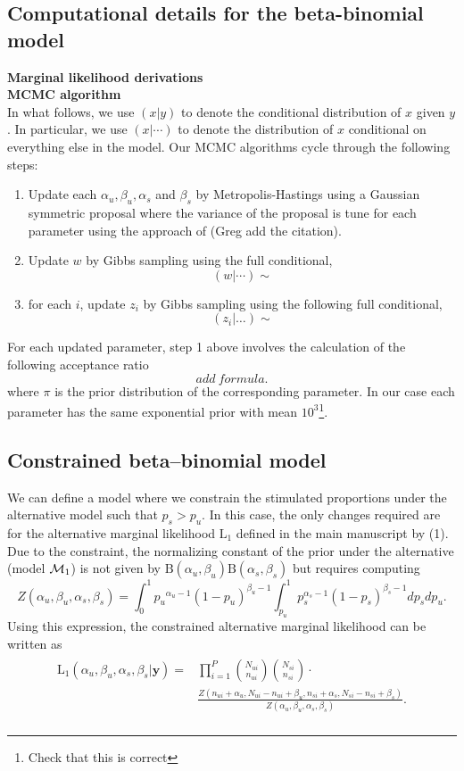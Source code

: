 \documentclass{article}
\begin{document}
\subsection{Computational details for the beta-binomial model}
\noindent\textbf{Marginal likelihood derivations}\\
\noindent\textbf{MCMC algorithm}\\
In what follows, we use $(x|y)$ to denote the conditional distribution of $x$ given $y$. In particular, we use $(x|\cdots)$ to denote the distribution of $x$ conditional on everything else in the model. Our MCMC algorithms cycle through the following steps: 
\begin{enumerate}
\item Update each $\alpha_u, \beta_u, \alpha_s$ and $\beta_s$ by Metropolis-Hastings using a Gaussian symmetric proposal where the variance of the proposal is tune for each parameter using the approach of (Greg add the citation).
\item Update $w$ by Gibbs sampling using the full conditional,
\[
(w|\cdots)\sim
\]
\item for each $i$, update $z_i$ by Gibbs sampling using the following full conditional,
\[
(z_i|\dots)\sim
\]
\end{enumerate}
For each updated parameter, step 1 above involves the calculation of the following acceptance ratio
\[
add\ formula.
\]
where $\pi$ is the prior distribution of the corresponding parameter. In our case each parameter has the same exponential prior with mean $10^3$\footnote{Check that this is correct}.
\subsection{Constrained beta--binomial model}
\label{supp:constrained}
We can define a model where we constrain the stimulated proportions under the alternative model such that $p_s>p_u$. In this case, the only changes required are for the alternative marginal likelihood $\mathrm{L}_1$ defined in the main manuscript by (1). Due to the constraint, the normalizing constant of the prior under the alternative (model ${\cal M}_1$) is not given by $\mathrm{B}(\alpha_u,\beta_u)\mathrm{B}(\alpha_s,\beta_s)$ but requires computing \[
Z(\alpha_u, \beta_u, \alpha_s, \beta_s)=\int_{0}^1{p_u}^{\alpha_u-1}(1-p_u)^{\beta_u-1}\int_{p_u}^1 p_s^{\alpha_s-1}(1-p_s)^{\beta_s-1}dp_sdp_u.
\]
Using this expression, the constrained alternative marginal likelihood can be written as 
\begin{align}
	\begin{split}
\mathrm{L}_1(\alpha_u,\beta_u,\alpha_s,\beta_s|\mathbf{y}) 
=&\prod_{i=1}^P\binom{N_{ui}}{n_{ui}} \binom{N_{si}}{n_{si}}\cdot\\ &\frac{Z(n_{ui}+\alpha_u,N_{ui}-n_{ui}+\beta_u,n_{si}+\alpha_s,N_{si}-n_{si}+\beta_s)}{Z(\alpha_u,\beta_u,\alpha_s,\beta_s)}.\\
\label{model2:constrained}
\end{split}
\end{align}
\end{document}
